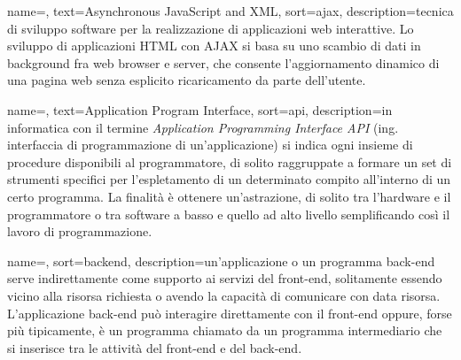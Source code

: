 	



\renewcommand{\glossaryname}{Glossario}


{
	name=,
	text=Asynchronous JavaScript and XML,
	sort=ajax,
	description={tecnica di sviluppo software per la realizzazione di applicazioni web interattive. Lo sviluppo di applicazioni HTML con AJAX si basa su uno scambio di dati in background fra web browser e server, che consente l'aggiornamento dinamico di una pagina web senza esplicito ricaricamento da parte dell'utente.}
}

{
    name=,
    text=Application Program Interface,
    sort=api,
    description={in informatica con il termine \emph{Application Programming Interface API} (ing. interfaccia di programmazione di un'applicazione) si indica ogni insieme di procedure disponibili al programmatore, di solito raggruppate a formare un set di strumenti specifici per l'espletamento di un determinato compito all'interno di un certo programma. La finalità è ottenere un'astrazione, di solito tra l'hardware e il programmatore o tra software a basso e quello ad alto livello semplificando così il lavoro di programmazione.}
}

{
	name=,
	sort=backend,
	description={un'applicazione o un programma back-end serve indirettamente come supporto ai servizi del front-end, solitamente essendo vicino alla risorsa richiesta o avendo la capacità di comunicare con data risorsa. L'applicazione back-end può interagire direttamente con il front-end oppure, forse più tipicamente, è un programma chiamato da un programma intermediario che si inserisce tra le attività del front-end e del back-end.}
}

